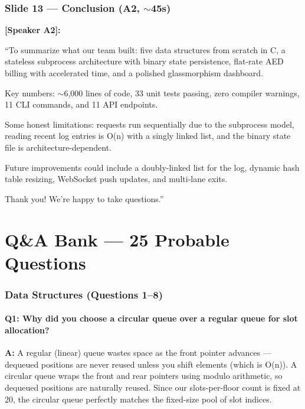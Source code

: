 \documentclass[12pt, a4paper]{article}
\begin{document}
\section{Slide 13 --- Conclusion (A2, $\sim$45s)}

\textbf{[Speaker A2]:}

``To summarize what our team built: five data structures from scratch in C, a stateless subprocess architecture with binary state persistence, flat-rate AED billing with accelerated time, and a polished glassmorphism dashboard.

Key numbers: $\sim$6,000 lines of code, 33 unit tests passing, zero compiler warnings, 11 CLI commands, and 11 API endpoints.

Some honest limitations: requests run sequentially due to the subprocess model, reading recent log entries is O(n) with a singly linked list, and the binary state file is architecture-dependent.

Future improvements could include a doubly-linked list for the log, dynamic hash table resizing, WebSocket push updates, and multi-lane exits.

Thank you! We're happy to take questions.''


\newpage

\part{Q\&A Bank --- 25 Probable Questions}

\section{Data Structures (Questions 1--8)}

\subsection{Q1: Why did you choose a circular queue over a regular queue for slot allocation?}

\textbf{A:} A regular (linear) queue wastes space as the front pointer advances --- dequeued positions are never reused unless you shift elements (which is O(n)). A circular queue wraps the front and rear pointers using modulo arithmetic, so dequeued positions are naturally reused. Since our slots-per-floor count is fixed at 20, the circular queue perfectly matches the fixed-size pool of slot indices.
\end{document}
